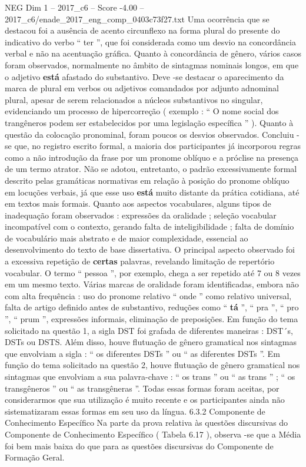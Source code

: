 \begin{textsample}{NEG Dim 1 – 2017\_c6 – Score -4.00 – 2017\_c6/enade\_2017\_eng\_comp\_0403c73f27.txt}
Uma ocorrência que se destacou foi a ausência de acento circunflexo na forma plural do presente do indicativo do verbo “ ter ”, que foi considerada como um desvio na concordância verbal e não na acentuação gráfica.
Quanto à concordância de gênero, vários casos foram observados, normalmente no âmbito de sintagmas nominais longos, em que o adjetivo \textbf{está} afastado do substantivo.
Deve -se destacar o aparecimento da marca de plural em verbos ou adjetivos comandados por adjunto adnominal plural, apesar de serem relacionados a núcleos substantivos no singular, evidenciando um processo de hipercorreção ( exemplo : “ O nome social dos trangêneros podem ser estabelecidos por uma legislação específica ” ).
Quanto à questão da colocação pronominal, foram poucos os desvios observados.
Concluiu -se que, no registro escrito formal, a maioria dos participantes já incorporou regras como a não introdução da frase por um pronome oblíquo e a próclise na presença de um termo atrator.
Não se adotou, entretanto, o padrão excessivamente formal descrito pelas gramáticas normativas em relação à posição do pronome oblíquo em locuções verbais, já que esse uso \textbf{está} muito distante da prática cotidiana, até em textos mais formais.
Quanto aos aspectos vocabulares, alguns tipos de inadequação foram observados : expressões da oralidade ; seleção vocabular incompatível com o contexto, gerando falta de inteligibilidade ; falta de domínio de vocabulário mais abstrato e de maior complexidade, essencial ao desenvolvimento do texto de base dissertativa.
O principal aspecto observado foi a excessiva repetição de \textbf{certas} palavras, revelando limitação de repertório vocabular.
O termo “ pessoa ”, por exemplo, chega a ser repetido até 7 ou 8 vezes em um mesmo texto.
Várias marcas de oralidade foram identificadas, embora não com alta frequência : uso do pronome relativo “ onde ” como relativo universal, falta de artigo definido antes de substantivo, reduções como “ \textbf{tá} ”, “ pra ”, “ pro ”, “ prum ”, expressões informais, eliminação de preposições.
Em função do tema solicitado na questão 1, a sigla DST foi grafada de diferentes maneiras : DST´s, DSTs ou DSTS.
Além disso, houve flutuação de gênero gramatical nos sintagmas que envolviam a sigla : “ os diferentes DSTs ” ou “ as diferentes DSTs ”.
Em função do tema solicitado na questão 2, houve flutuação de gênero gramatical nos sintagmas que envolviam a sua palavra-chave : “ os trans ” ou “ as trans ” ; “ os transgêneros ” ou “ as transgêneras ”.
Todas essas formas foram aceitas, por considerarmos que sua utilização é muito recente e os participantes ainda não sistematizaram essas formas em seu uso da língua. 6.3.2 Componente de Conhecimento Específico Na parte da prova relativa às questões discursivas do Componente de Conhecimento Específico ( Tabela 6.17 ), observa -se que a Média foi bem mais baixa do que para as questões discursivas do Componente de Formação Geral.

\end{textsample}

